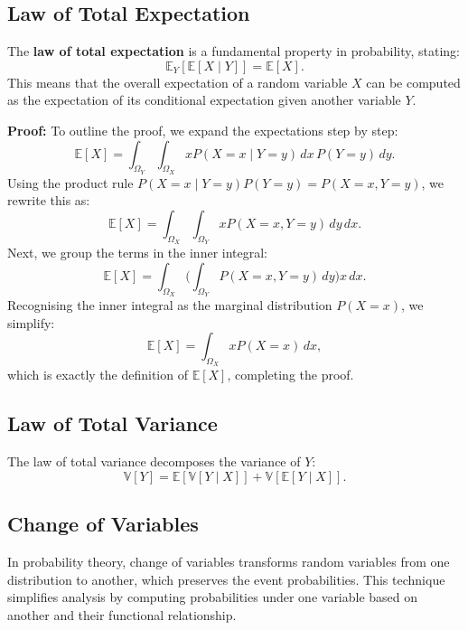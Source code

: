 \subsection{Law of Total Expectation}

The \textbf{law of total expectation} is a fundamental property in probability, stating:
\[
    \mathbb{E}_Y[\mathbb{E}[X \mid Y]] = \mathbb{E}[X].
\]
This means that the overall expectation of a random variable $X$ can be computed as the expectation of its conditional expectation given another variable $Y$.


\textbf{Proof:} To outline the proof, we expand the expectations step by step:
\[
    \mathbb{E}[X] = \int_{\Omega_Y} \int_{\Omega_X} x P(X = x \mid Y = y) \, dx \, P(Y = y) \, dy.
\]
Using the product rule $P(X = x \mid Y = y) P(Y = y) = P(X = x, Y = y)$, we rewrite this as:
\[
    \mathbb{E}[X] = \int_{\Omega_X} \int_{\Omega_Y} x P(X = x, Y = y) \, dy \, dx.
\]
Next, we group the terms in the inner integral:
\[
    \mathbb{E}[X] = \int_{\Omega_X} \bigg(\int_{\Omega_Y} P(X = x, Y = y) \, dy\bigg) x \, dx.
\]
Recognising the inner integral as the marginal distribution $P(X = x)$, we simplify:
\[
    \mathbb{E}[X] = \int_{\Omega_X} x P(X = x) \, dx,
\]
which is exactly the definition of $\mathbb{E}[X]$, completing the proof.


\subsection{Law of Total Variance}

The law of total variance decomposes the variance of $Y$:
\[
    \mathbb{V}[Y] = \mathbb{E}[\mathbb{V}[Y \mid X]] + \mathbb{V}[\mathbb{E}[Y \mid X]].
\]

\subsection{Change of Variables}

In probability theory, change of variables transforms random variables from one distribution to another, which preserves the event probabilities. This technique simplifies analysis by computing probabilities under one variable based on another and their functional relationship.\bigskip

